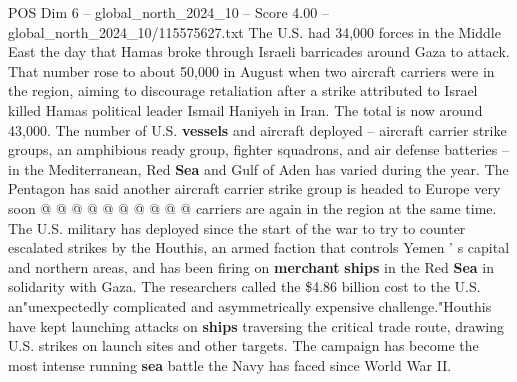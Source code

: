 \begin{textsample}{POS Dim 6 – global\_north\_2024\_10 – Score 4.00 – global\_north\_2024\_10/115575627.txt}
The U.S. had 34,000 forces in the Middle East the day that Hamas broke through Israeli barricades around Gaza to attack.
That number rose to about 50,000 in August when two aircraft carriers were in the region, aiming to discourage retaliation after a strike attributed to Israel killed Hamas political leader Ismail Haniyeh in Iran.
The total is now around 43,000.
The number of U.S. \textbf{vessels} and aircraft deployed -- aircraft carrier strike groups, an amphibious ready group, fighter squadrons, and air defense batteries -- in the Mediterranean, Red \textbf{Sea} and Gulf of Aden has varied during the year.
The Pentagon has said another aircraft carrier strike group is headed to Europe very soon @ @ @ @ @ @ @ @ @ @ carriers are again in the region at the same time.
The U.S. military has deployed since the start of the war to try to counter escalated strikes by the Houthis, an armed faction that controls Yemen ' s capital and northern areas, and has been firing on \textbf{merchant} \textbf{ships} in the Red \textbf{Sea} in solidarity with Gaza.
The researchers called the \$4.86 billion cost to the U.S. an"unexpectedly complicated and asymmetrically expensive challenge."Houthis have kept launching attacks on \textbf{ships} traversing the critical trade route, drawing U.S. strikes on launch sites and other targets.
The campaign has become the most intense running \textbf{sea} battle the Navy has faced since World War II.

\end{textsample}
